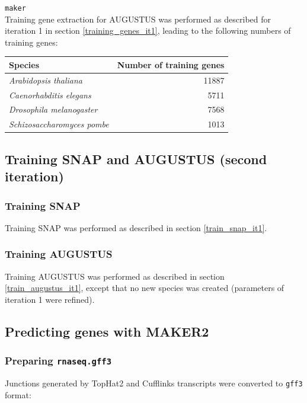 \documentclass[a4paper,10pt]{report}
\begin{document}
\noindent \texttt{maker}\\

\noindent Training gene extraction for AUGUSTUS was performed as described for iteration 1 in section \ref{training_genes_it1}, leading to the following numbers of training genes:

\begin{center}
\begin{tabular}{l r}
\hline
Species & Number of training genes\\
\hline
\textit{Arabidopsis thaliana} & 11887\\
\textit{Caenorhabditis elegans} & 5711\\
\textit{Drosophila melanogaster} & 7568\\
\textit{Schizosaccharomyces pombe} & 1013\\
\hline
\end{tabular}
\end{center}

\subsection{Training SNAP and AUGUSTUS (second iteration)}

\subsubsection{Training SNAP}

Training SNAP was performed as described in section \ref{train_snap_it1}.

\subsubsection{Training AUGUSTUS}

Training AUGUSTUS was performed as described in section \ref{train_augustus_it1}, except that no new species was created (parameters of iteration 1 were refined).

\subsection{Predicting genes with MAKER2}

\subsubsection{Preparing \texttt{rnaseq.gff3}}

Junctions generated by TopHat2 and Cufflinks transcripts were converted to \texttt{gff3} format:
\end{document}
